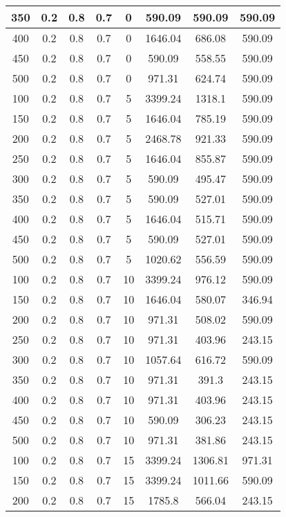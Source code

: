 \documentclass[a4paper, 12pt]{extreport}
\begin{document}
\begin{itemize}
\begin{longtable}{|c|c|c|c|c|c|c|c|}
			350 & 0.2 & 0.8 & 0.7 & 0 & 590.09 & 590.09 & 590.09 \\\hline
			400 & 0.2 & 0.8 & 0.7 & 0 & 1646.04 & 686.08 & 590.09 \\\hline
			450 & 0.2 & 0.8 & 0.7 & 0 & 590.09 & 558.55 & 590.09 \\\hline
			500 & 0.2 & 0.8 & 0.7 & 0 & 971.31 & 624.74 & 590.09 \\\hline
			100 & 0.2 & 0.8 & 0.7 & 5 & 3399.24 & 1318.1 & 590.09 \\\hline
			150 & 0.2 & 0.8 & 0.7 & 5 & 1646.04 & 785.19 & 590.09 \\\hline
			200 & 0.2 & 0.8 & 0.7 & 5 & 2468.78 & 921.33 & 590.09 \\\hline
			250 & 0.2 & 0.8 & 0.7 & 5 & 1646.04 & 855.87 & 590.09 \\\hline
			300 & 0.2 & 0.8 & 0.7 & 5 & 590.09 & 495.47 & 590.09 \\\hline
			350 & 0.2 & 0.8 & 0.7 & 5 & 590.09 & 527.01 & 590.09 \\\hline
			400 & 0.2 & 0.8 & 0.7 & 5 & 1646.04 & 515.71 & 590.09 \\\hline
			450 & 0.2 & 0.8 & 0.7 & 5 & 590.09 & 527.01 & 590.09 \\\hline
			500 & 0.2 & 0.8 & 0.7 & 5 & 1020.62 & 556.59 & 590.09 \\\hline
			100 & 0.2 & 0.8 & 0.7 & 10 & 3399.24 & 976.12 & 590.09 \\\hline
			150 & 0.2 & 0.8 & 0.7 & 10 & 1646.04 & 580.07 & 346.94 \\\hline
			200 & 0.2 & 0.8 & 0.7 & 10 & 971.31 & 508.02 & 590.09 \\\hline
			250 & 0.2 & 0.8 & 0.7 & 10 & 971.31 & 403.96 & 243.15 \\\hline
			300 & 0.2 & 0.8 & 0.7 & 10 & 1057.64 & 616.72 & 590.09 \\\hline
			350 & 0.2 & 0.8 & 0.7 & 10 & 971.31 & 391.3 & 243.15 \\\hline
			400 & 0.2 & 0.8 & 0.7 & 10 & 971.31 & 403.96 & 243.15 \\\hline
			450 & 0.2 & 0.8 & 0.7 & 10 & 590.09 & 306.23 & 243.15 \\\hline
			500 & 0.2 & 0.8 & 0.7 & 10 & 971.31 & 381.86 & 243.15 \\\hline
			100 & 0.2 & 0.8 & 0.7 & 15 & 3399.24 & 1306.81 & 971.31 \\\hline
			150 & 0.2 & 0.8 & 0.7 & 15 & 3399.24 & 1011.66 & 590.09 \\\hline
			200 & 0.2 & 0.8 & 0.7 & 15 & 1785.8 & 566.04 & 243.15 \\\hline

\end{longtable}
\end{itemize}
\end{document}
